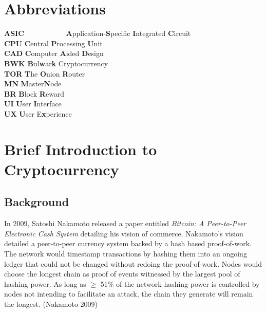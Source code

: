 \documentclass[11pt,a4paperpaper,]{report}
\begin{document}
\tableofcontents

\newpage

\chapter*{Abbreviations}\label{abbreviations}

\begin{tabbing}
\textbf{ASIC}~~~~~~~~~~~    \= \textbf{A}pplication-\textbf{S}pecific \textbf{I}ntegrated \textbf{C}ircuit\\
\textbf{CPU}    \> \textbf{C}entral \textbf{P}rocessing \textbf{U}nit \\
\textbf{CAD}    \> \textbf{C}omputer \textbf{A}ided \textbf{D}esign \\
\textbf{BWK}    \> \textbf{B}ul\textbf{w}ar\textbf{k} Cryptocurrency \\
\textbf{TOR}    \> \textbf{T}he \textbf{O}nion \textbf{R}outer \\
\textbf{MN} \> \textbf{M}aster\textbf{N}ode \\
\textbf{BR} \> \textbf{B}lock \textbf{R}eward \\
\textbf{UI} \> \textbf{U}ser \textbf{I}nterface \\
\textbf{UX} \> \textbf{U}ser E\textbf{x}perience \\
\end{tabbing}

\newpage

\setcounter{page}{1} \renewcommand{\thepage}{\arabic{page}}

\chapter{Brief Introduction to
Cryptocurrency}\label{brief-introduction-to-cryptocurrency}

\section{Background}\label{background}

In 2009, Satoshi Nakamoto released a paper entitled
\textit{Bitcoin: A Peer-to-Peer Electronic Cash System} detailing his
vision of commerce. Nakamoto's vision detailed a peer-to-peer currency
system backed by a hash based proof-of-work. The network would timestamp
transactions by hashing them into an ongoing ledger that could not be
changed without redoing the proof-of-work. Nodes would choose the
longest chain as proof of events witnessed by the largest pool of
hashing power. As long as \(\geq\) 51\% of the network hashing power is
controlled by nodes not intending to facilitate an attack, the chain
they generate will remain the longest. (Nakamoto 2009)
\end{document}
